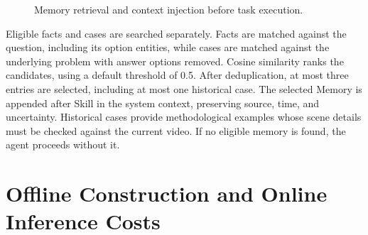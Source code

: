 \begin{figure}[ht]
\centering
{}
\caption{Memory retrieval and context injection before task execution.}
\label{fig:memory_retrieval}
\end{figure}

Eligible facts and cases are searched separately. Facts are matched against the question, including its option entities, while cases are matched against the underlying problem with answer options removed. Cosine similarity ranks the candidates, using a default threshold of 0.5. After deduplication, at most three entries are selected, including at most one historical case. The selected Memory is appended after Skill in the system context, preserving source, time, and uncertainty. Historical cases provide methodological examples whose scene details must be checked against the current video. If no eligible memory is found, the agent proceeds without it.

\section{Offline Construction and Online Inference Costs}
\label{app:offline_construction_cost}
\label{app:evaluation_costs}

